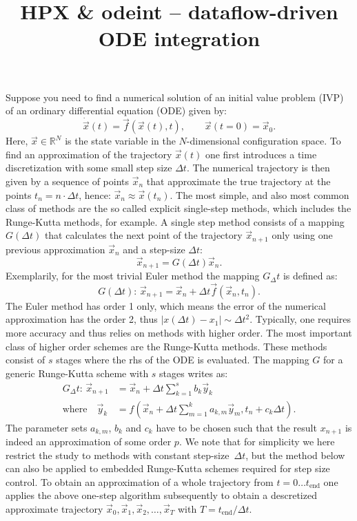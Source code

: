 \documentclass[a4wide,10pt]{scrartcl}
\title{HPX \& odeint -- dataflow-driven ODE integration}
\author{}
\newcommand{\Dt}{\Delta t}
\begin{document}
\maketitle

Suppose you need to find a numerical solution of an initial value problem (IVP) of an ordinary differential equation (ODE) given by:
\begin{equation}
 \dot{\vec x}(t) = \vec f(\vec x(t), t), \qquad \vec x(t=0) = \vec x_0.
\end{equation} 
Here, $\vec x \in \mathbb{R}^N$ is the state variable in the $N$-dimensional configuration space.
To find an approximation of the trajectory $\vec x(t)$ one first introduces a time discretization with some small step size $\Delta t$.
The numerical trajectory is then given by a sequence of points $\vec x_n$ that approximate the true trajectory at the points $t_n=n\cdot \Dt$, hence: $\vec x_n\approx\vec x(t_n)$.
The most simple, and also most common class of methods are the so called explicit single-step methods, which includes the Runge-Kutta methods, for example.
A single step method consists of a mapping $G(\Dt)$ that calculates the next point of the trajectory $\vec x_{n+1}$ only using one previous approximation $\vec x_n$ and a step-size $\Dt$:
\begin{equation}
 \vec x_{n+1} = G(\Dt) \vec x_n.
\end{equation}
Exemplarily, for the most trivial Euler method the mapping $G_\Dt$ is defined as:
\begin{equation}
 G(\Dt):\, \vec x_{n+1} = \vec x_n + \Dt \vec f(\vec x_n,t_n).
\end{equation}
The Euler method has order 1 only, which means the error of the numerical approximation has the order 2, thus $|x(\Dt) - x_1|\sim \Dt^2$.
Typically, one requires more accuracy and thus relies on methods with higher order.
The most important class of higher order schemes are the Runge-Kutta methods. 
These methods consist of $s$ stages where the rhs of the ODE is evaluated.
The mapping $G$ for a generic Runge-Kutta scheme with $s$ stages writes as:
\begin{equation}
 \begin{aligned}
    G_\Dt:\, \vec x_{n+1} &= \vec x_n + \Dt \sum_{k=1}^{s} b_k \vec y_k \\
    \text{where}\quad \vec y_k &= f( \vec x_n + \Dt \sum_{m=1}^k a_{k,m} \vec y_m , t_n+c_k\Dt).
   \end{aligned}
\end{equation}
The parameter sets $a_{k,m}$, $b_k$ and $c_k$ have to be chosen such that the result $x_{n+1}$ is indeed an approximation of some order $p$.
We note that for simplicity we here restrict the study to methods with constant step-size~$\Dt$, but the method below can also be applied to embedded Runge-Kutta schemes required for step size control.
To obtain an approximation of a whole trajectory from $t=0\dots t_\text{end}$ one applies the above one-step algorithm subsequently to obtain a descretized approximate trajectory $\vec x_0,\vec x_1,\vec x_2,\dots,\vec x_T$ with $T=t_\text{end}/\Dt$.
\end{document}
